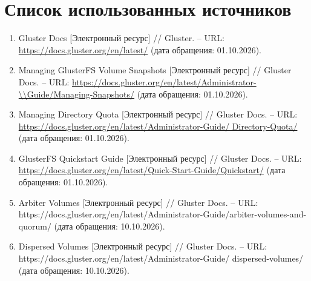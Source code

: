 
\section*{Список использованных источников}

\begin{enumerate}
    \item Gluster Docs [Электронный ресурс] // Gluster. -- URL:
    \url{https://docs.gluster.org/en/latest/} (дата обращения: 01.10.2026).
    \item Managing GlusterFS Volume Snapshots [Электронный ресурс] //
    Gluster Docs. -- URL:
    \url{https://docs.gluster.org/en/latest/Administrator-\\Guide/Managing-Snapshots/}
    (дата обращения: 01.10.2026).
    \item Managing Directory Quota [Электронный ресурс] // Gluster Docs. --
    URL: \url{https://docs.gluster.org/en/latest/Administrator-Guide/
    Directory-Quota/}
    (дата обращения: 01.10.2026).
    \item GlusterFS Quickstart Guide [Электронный ресурс] // Gluster Docs. --
    URL: \url{https://docs.gluster.org/en/latest/Quick-Start-Guide/Quickstart/}
    (дата обращения: 01.10.2026).
        \item Arbiter Volumes [Электронный ресурс] // Gluster Docs. --
    URL: https://docs.gluster.org/en/latest/Administrator-Guide/arbiter-volumes-and-quorum/
    (дата обращения: 10.10.2026).
    \item Dispersed Volumes [Электронный ресурс] // Gluster Docs. --
    URL: https://docs.gluster.org/en/latest/Administrator-Guide/ dispersed-volumes/
    (дата обращения: 10.10.2026).
\end{enumerate}